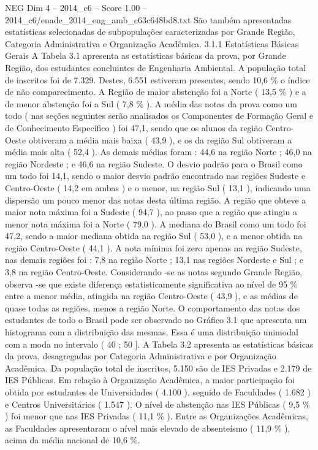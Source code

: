 \begin{textsample}{NEG Dim 4 – 2014\_c6 – Score 1.00 – 2014\_c6/enade\_2014\_eng\_amb\_c63c648bd8.txt}
São também apresentadas estatísticas selecionadas de subpopulações caracterizadas por Grande Região, Categoria Administrativa e Organização Acadêmica. 3.1.1 Estatísticas Básicas Gerais A Tabela 3.1 apresenta as estatísticas básicas da prova, por Grande Região, dos estudantes concluintes de Engenharia Ambiental.
A população total de inscritos foi de 7.329.
Destes, 6.551 estiveram presentes, sendo 10,6 \% o índice de não comparecimento.
A Região de maior abstenção foi a Norte ( 13,5 \% ) e a de menor abstenção foi a Sul ( 7,8 \% ).
A média das notas da prova como um todo ( nas seções seguintes serão analisados os Componentes de Formação Geral e de Conhecimento Específico ) foi 47,1, sendo que os alunos da região Centro-Oeste obtiveram a média mais baixa ( 43,9 ), e os da região Sul obtiveram a média mais alta ( 52,4 ).
As demais médias foram : 44,6 na região Norte ; 46,0 na região Nordeste ; e 46,6 na região Sudeste.
O desvio padrão para o Brasil como um todo foi 14,1, sendo o maior desvio padrão encontrado nas regiões Sudeste e Centro-Oeste ( 14,2 em ambas ) e o menor, na região Sul ( 13,1 ), indicando uma dispersão um pouco menor das notas desta última região.
A região que obteve a maior nota máxima foi a Sudeste ( 94,7 ), ao passo que a região que atingiu a menor nota máxima foi a Norte ( 79,0 ).
A mediana do Brasil como um todo foi 47,2, sendo a maior mediana obtida na região Sul ( 53,0 ), e a menor obtida na região Centro-Oeste ( 44,1 ).
A nota mínima foi zero apenas na região Sudeste, nas demais regiões foi : 7,8 na região Norte ; 13,1 nas regiões Nordeste e Sul ; e 3,8 na região Centro-Oeste.
Considerando -se as notas segundo Grande Região, observa -se que existe diferença estatisticamente significativa ao nível de 95 \% entre a menor média, atingida na região Centro-Oeste ( 43,9 ), e as médias de quase todas as regiões, menos a região Norte.
O comportamento das notas dos estudantes de todo o Brasil pode ser observado no Gráfico 3.1 que apresenta um histograma com a distribuição das mesmas.
Essa é uma distribuição unimodal com a moda no intervalo ( 40 ; 50 ].
A Tabela 3.2 apresenta as estatísticas básicas da prova, desagregadas por Categoria Administrativa e por Organização Acadêmica.
Da população total de inscritos, 5.150 são de IES Privadas e 2.179 de IES Públicas.
Em relação à Organização Acadêmica, a maior participação foi obtida por estudantes de Universidades ( 4.100 ), seguido de Faculdades ( 1.682 ) e Centros Universitários ( 1.547 ).
O nível de abstenção nas IES Públicas ( 9,5 \% ) foi menor que nas IES Privadas ( 11,1 \% ).
Entre as Organizações Acadêmicas, as Faculdades apresentaram o nível mais elevado de absenteísmo ( 11,9 \% ), acima da média nacional de 10,6 \%.

\end{textsample}
